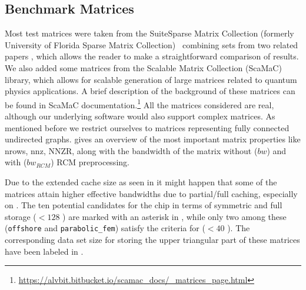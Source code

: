 \subsection{Benchmark Matrices}
\label{subsec:bench_mat}
Most test matrices were taken from the Suite\-Sparse Matrix Collection (formerly University of Florida Sparse Matrix Collection)~\cite{UOF} combining sets from two related papers \cite{RSB,park_ls}, which allows the reader to make a straightforward comparison of results.  We also added some matrices from the Scalable Matrix Collection (ScaMaC) library\cite{ScaMaC}, which allows for scalable generation of large matrices related to quantum physics applications. A brief description of the background of these matrices can be found in ScaMaC documentation.\footnote{\href{https://alvbit.bitbucket.io/scamac_docs/_matrices_page.html}{https://alvbit.bitbucket.io/scamac\_docs/\_matrices\_page.html}} All the matrices considered are real, although our underlying software would also support complex matrices.
As mentioned before we restrict ourselves to matrices representing fully connected undirected graphs.
 gives an overview of the most important matrix properties like \acrfull{nrows}, \acrfull{nnz}, \acrfull{NNZR}, along with the bandwidth of the matrix without ($bw$) and with ($bw_{RCM}$) \acrshort{RCM} preprocessing. 

Due to the extended cache size as seen in  it
might happen that some of the matrices attain higher effective
bandwidths due to partial/full caching, especially on \SKX. The ten potential candidates
for the \SKX chip in terms of symmetric and full storage ($< 128$ \MB)
are marked with an asterisk in , while only
two among these (\texttt{offshore} and \texttt{parabolic\_fem}) 
satisfy the criteria for \IVB ($< 40$ \MB). The corresponding data set
size for storing the upper triangular part of these matrices have been
labeled in .

